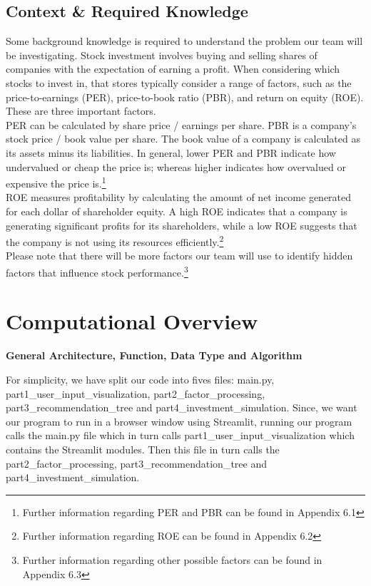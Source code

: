\documentclass[fontsize=11pt]{article}
\begin{document}
\subsection{Context \& Required Knowledge}
Some background knowledge is required to understand the problem our team will be investigating. Stock investment involves buying and selling shares of companies with the expectation of earning a profit. When considering which stocks to invest in, that stores typically consider a range of factors, such as the price-to-earnings (PER), price-to-book ratio (PBR), and return on equity (ROE). These are three important factors.\\

PER can be calculated by share price / earnings per share. PBR is a company’s stock price / book value per share. The book value of a company is calculated as its assets minus its liabilities. In general, lower PER and PBR indicate how undervalued or cheap the price is; whereas higher indicates how overvalued or expensive the price is.\footnote{Further information regarding PER and PBR can be found in Appendix 6.1}\\

ROE measures profitability by calculating the amount of net income generated for each dollar of shareholder equity. A high ROE indicates that a company is generating significant profits for its shareholders, while a low ROE suggests that the company is not using its resources efficiently.\footnote{Further information regarding ROE can be found in Appendix 6.2}
\\

Please note that there will be more factors our team will use to identify hidden factors that influence stock performance.\footnote{Further information regarding other possible factors can be found in Appendix 6.3}
\section{Computational Overview}
\textbf{General Architecture, Function, Data Type and Algorithm}



For simplicity, we have split our code into fives files: main.py, part1\_user\_input\_visualization, part2\_factor\_processing, part3\_recommendation\_tree and part4\_investment\_simulation. Since, we want our program to run in a browser window using Streamlit, running our program calls the main.py file which in turn calls part1\_user\_input\_visualization which contains the Streamlit modules. Then this file in turn calls the part2\_factor\_processing, part3\_recommendation\_tree and part4\_investment\_simulation. \\
\end{document}
